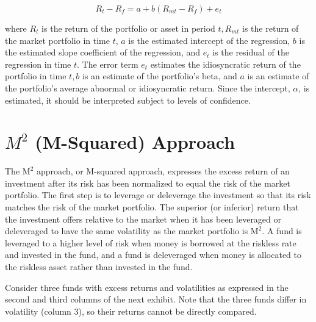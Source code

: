 \documentclass[11pt]{article}
\begin{document}
\begin{equation*}
R_{t}-R_{f}=a+b\left(R_{m t}-R_{f}\right)+e_{t} \tag{2}
\end{equation*}


where $R_{t}$ is the return of the portfolio or asset in period $t, R_{m t}$ is the return of the market portfolio in time $t$, $a$ is the estimated intercept of the regression, $b$ is the estimated slope coefficient of the regression, and $e_{t}$ is the residual of the regression in time $t$. The error term $e_{t}$ estimates the idiosyncratic return of the portfolio in time $t, b$ is an estimate of the portfolio's beta, and $a$ is an estimate of the portfolio's average abnormal or idiosyncratic return. Since the intercept, $\alpha$, is estimated, it should be interpreted subject to levels of confidence.

\section*{$M^{2}$ (M-Squared) Approach}
The $\mathrm{M}^{2}$ approach, or $\mathrm{M}$-squared approach, expresses the excess return of an investment after its risk has been normalized to equal the risk of the market portfolio. The first step is to leverage or deleverage the investment so that its risk matches the risk of the market portfolio. The superior (or inferior) return that the investment offers relative to the market when it has been leveraged or deleveraged to have the same volatility as the market portfolio is $\mathrm{M}^{2}$. A fund is leveraged to a higher level of risk when money is borrowed at the riskless rate and invested in the fund, and a fund is deleveraged when money is allocated to the riskless asset rather than invested in the fund.

Consider three funds with excess returns and volatilities as expressed in the second and third columns of the next exhibit. Note that the three funds differ in volatility (column 3), so their returns cannot be directly compared.
\end{document}
